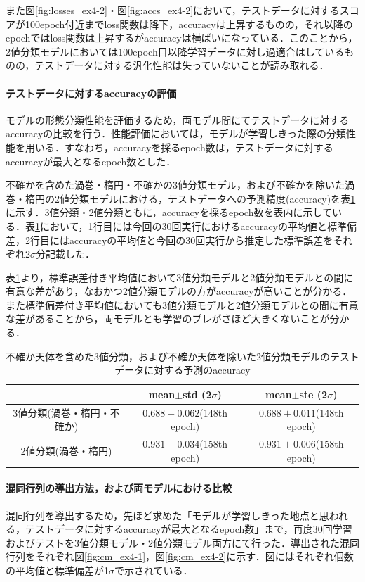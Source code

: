 \documentclass[a4j, 11pt]{jreport}
\begin{document}
また図\ref{fig:losses_ex4-2}・図\ref{fig:accs_ex4-2}において，テストデータに対するスコアが100epoch付近までloss関数は降下，accuracyは上昇するものの，それ以降のepochではloss関数は上昇するがaccuracyは横ばいになっている．このことから，2値分類モデルにおいては100epoch目以降学習データに対し過適合はしているものの，テストデータに対する汎化性能は失っていないことが読み取れる．

\paragraph{テストデータに対するaccuracyの評価}
モデルの形態分類性能を評価するため，両モデル間にてテストデータに対するaccuracyの比較を行う．性能評価においては，モデルが学習しきった際の分類性能を用いる．すなわち，accuracyを採るepoch数は，テストデータに対するaccuracyが最大となるepoch数とした．


不確かを含めた渦巻・楕円・不確かの3値分類モデル，および不確かを除いた渦巻・楕円の2値分類モデルにおける，テストデータへの予測精度(accuracy)を表\ref{tb:accs_4.2}に示す．3値分類・2値分類ともに，accuracyを採るepoch数を表内に示している．表\ref{tb:accs_4.2}において，1行目には今回の30回実行におけるaccuracyの平均値と標準偏差，2行目にはaccuracyの平均値と今回の30回実行から推定した標準誤差をそれぞれ2$\sigma$分記載した．

表\ref{tb:accs_4.2}より，標準誤差付き平均値において3値分類モデルと2値分類モデルとの間に有意な差があり，なおかつ2値分類モデルの方がaccuracyが高いことが分かる．また標準偏差付き平均値においても3値分類モデルと2値分類モデルとの間に有意な差があることから，両モデルとも学習のブレがさほど大きくないことが分かる．

\begin{table}[htbp]
  \centering
	\caption{不確か天体を含めた3値分類，および不確か天体を除いた2値分類モデルのテストデータに対する予測のaccuracy}
  \begin{tabular}{|c|c|c|}
		\hline
    & mean$\pm$std (2$\sigma$) & mean$\pm$ste (2$\sigma$) \\ \hline
    3値分類(渦巻・楕円・不確か) & $0.688 \pm 0.062$(148th epoch) & $0.688 \pm 0.011$(148th epoch) \\ \hline
    2値分類(渦巻・楕円) & $0.931 \pm 0.034$(158th epoch) & $0.931 \pm 0.006$(158th epoch) \\ \hline
  \end{tabular}
  \label{tb:accs_4.2}
\end{table}

\paragraph{混同行列の導出方法，および両モデルにおける比較}
混同行列を導出するため，先ほど求めた「モデルが学習しきった地点と思われる，テストデータに対するaccuracyが最大となるepoch数」まで，再度30回学習およびテストを3値分類モデル・2値分類モデル両方にて行った．導出された混同行列をそれぞれ図\ref{fig:cm_ex4-1}，図\ref{fig:cm_ex4-2}に示す．図にはそれぞれ個数の平均値と標準偏差が1$\sigma$で示されている．
\end{document}
